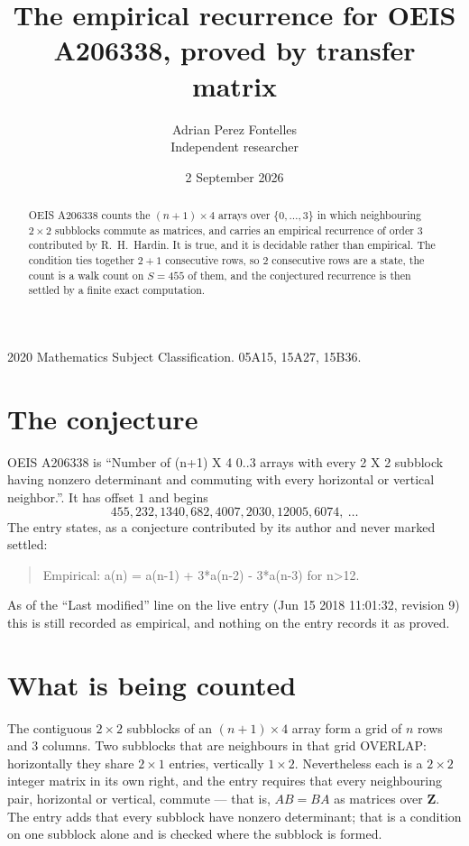 \documentclass[11pt,a4paper]{article}
\title{The empirical recurrence for OEIS A206338, proved by transfer matrix}
\author{Adrian Perez Fontelles\\ \small Independent researcher}
\date{2 September 2026}
\theoremstyle{plain}
\theoremstyle{definition}
\begin{document}
\maketitle

\begin{abstract}
OEIS A206338 counts the $(n+1)\times4$ arrays over $\{0,\dots,3\}$ in which
neighbouring $2\times2$ subblocks commute as matrices, and carries an empirical recurrence
of order $3$ contributed by R.~H.~Hardin. It is true, and it is decidable rather than
empirical. The condition ties together $2+1$ consecutive rows, so $2$ consecutive rows are
a state, the count is a walk count on $S=455$ of them, and the conjectured recurrence is then
settled by a finite exact computation.
\end{abstract}

\noindent\small 2020 Mathematics Subject Classification. 05A15, 15A27, 15B36.\normalsize

\section{The conjecture}

OEIS A206338 is ``Number of (n+1) X 4 0..3 arrays with every 2 X 2 subblock having nonzero determinant and commuting with every horizontal or vertical neighbor.''. It has offset $1$ and begins
\[
455, 232, 1340, 682, 4007, 2030, 12005, 6074,\ \dots
\]
The entry states, as a conjecture contributed by its author and never marked settled:
\begin{quote}
Empirical: a(n) = a(n-1) + 3*a(n-2) - 3*a(n-3) for n>12.
\end{quote}
As of the ``Last modified'' line on the live entry (Jun 15 2018 11:01:32, revision 9) this is still
recorded as empirical, and nothing on the entry records it as proved.

\section{What is being counted}

The contiguous $2\times2$ subblocks of an $(n+1)\times4$ array form a grid of $n$
rows and $3$ columns. Two subblocks that are neighbours in that
grid OVERLAP: horizontally they share $2\times1$ entries, vertically
$1\times2$. Nevertheless each is a $2\times2$ integer matrix in its own right, and
the entry requires that every neighbouring pair, horizontal or vertical, commute --- that is,
$AB=BA$ as matrices over $\mathbf{Z}$. The entry adds that every subblock have nonzero determinant; that is a condition on one subblock alone and is checked where the subblock is formed.
\end{document}
